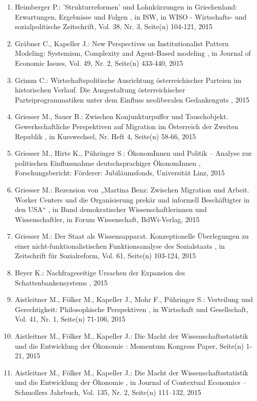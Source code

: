 \begin{enumerate}[leftmargin=*, labelsep=0.5cm]
	 \item Heimberger P.:  'Strukturreformen' und Lohnkürzungen in Griechenland: Erwartungen, Ergebnisse und Folgen  , in ISW, in WISO - Wirtschafts- und sozialpolitische Zeitschrift, Vol. 38, Nr. 3, Seite(n) 104-121, 2015
	 \item Gräbner C., Kapeller J.:  New Perspectives on  Institutionalist Pattern Modeling: Systemism, Complexity and  Agent-Based modeling  , in Journal of Economic Issues, Vol. 49, Nr. 2, Seite(n) 433-440, 2015
	 \item Grimm C.:  Wirtschaftspolitische Ausrichtung österreichischer Parteien im historischen Verlauf. Die Ausgestaltung österreichischer Parteiprogrammatiken unter dem Einfluss neoliberalen Gedankenguts  , 2015
	 \item Griesser M., Sauer B.:  Zwischen Konjunkturpuffer und Tauschobjekt. Gewerkschaftliche Perspektiven auf Migration im Österreich der Zweiten Republik  , in Kurswechsel, Nr. Heft 4, Seite(n) 58-66, 2015
	 \item Griesser M., Hirte K., Pühringer S.:  ÖkonomInnen und Politik – Analyse zur politischen Einflussnahme deutschsprachiger ÖkonomInnen  , Forschungsbericht: Förderer: Jubiläumsfonds, Universität Linz, 2015
	 \item Griesser M.:  Rezension von „Martina Benz: Zwischen Migration und Arbeit. Worker Centers und die Organisierung prekär und informell Beschäftigter in den USA“  , in Bund demokratischer Wissenschaftlerinnen und Wissenschaftler, in Forum Wissenschaft, BdWi-Verlag, 2015
	 \item Griesser M.:  Der Staat als Wissensapparat. Konzeptionelle Überlegungen zu einer nicht-funktionalistischen Funktionsanalyse des Sozialstaats  , in Zeitschrift für Sozialreform, Vol. 61, Seite(n) 103-124, 2015
	 \item Beyer K.:  Nachfrageseitige Ursachen der Expansion des Schattenbankensystems  , 2015
	 \item Aistleitner M., Fölker M., Kapeller J., Mohr F., Pühringer S.:  Verteilung und Gerechtigkeit: Philosophische  Perspektiven  , in Wirtschaft und Gesellschaft, Vol. 41, Nr. 1, Seite(n) 71-106, 2015
	 \item Aistleitner M., Fölker M., Kapeller J.:  Die Macht der Wissenschaftsstatistik und die Entwicklung der Ökonomie  : Momentum Kongress Paper, Seite(n) 1-21, 2015
	 \item Aistleitner M., Fölker M., Kapeller J.:  Die Macht der Wissenschaftsstatistik und die Entwicklung der Ökonomie  , in Journal of Contextual Economics – Schmollers Jahrbuch, Vol. 135, Nr. 2, Seite(n) 111–132, 2015
\end{enumerate} 
